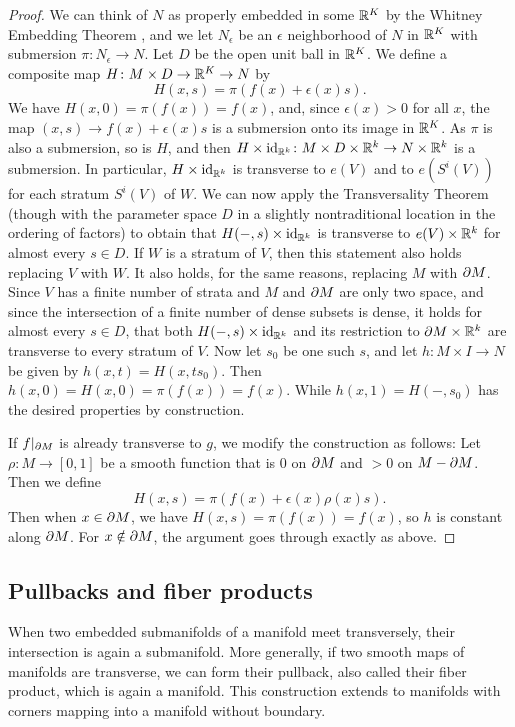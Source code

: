 \begin{proof}
	We can think of $N$ as properly embedded in some $\mathbb{R}^K$ by the Whitney Embedding Theorem \cite[Section 1.8]{GuPo74}, and we let $N_\epsilon$ be an $\epsilon$ neighborhood of $N$ in $\mathbb{R}^K$ with submersion $\pi \colon N_\epsilon \to N$.
	Let $D$ be the open unit ball in $\mathbb{R}^K$.
	We define a composite map $H \colon M \times D \to \mathbb{R}^K \to N$ by
	$$H(x,s) = \pi(f(x)+ \epsilon(x)s).$$
	We have $H(x,0) = \pi(f(x)) = f(x)$, and, since $\epsilon(x)>0$ for all $x$, the map $(x,s) \to f(x)+ \epsilon(x)s$ is a submersion onto its image in $\mathbb{R}^K$.
	As $\pi$ is also a submersion, so is $H$, and then $H \times \mathrm{id}_{\mathbb{R}^k} \colon M \times D \times \mathbb{R}^k \to N \times \mathbb{R}^k$ is a submersion.
	In particular, $H \times \mathrm{id}_{\mathbb{R}^k}$ is transverse to $e(V)$ and to $e(S^i(V))$ for each stratum $S^i(V)$ of $W$.
	We can now apply the Transversality Theorem (though with the parameter space $D$ in a slightly nontraditional location in the ordering of factors) to obtain that $H(-,s) \times \mathrm{id}_{\mathbb{R}^k}$ is transverse to $e(V) \times \mathbb{R}^k$ for almost every $s \in D$.
	If $W$ is a stratum of $V$, then this statement also holds replacing $V$ with $W$.
	It also holds, for the same reasons, replacing $M$ with $\partial M$.
	Since $V$ has a finite number of strata and $M$ and $\partial M$ are only two space, and since the intersection of a finite number of dense subsets is dense, it holds for almost every $s \in D$, that both $H(-,s) \times \mathrm{id}_{\mathbb{R}^k}$ and its restriction to $\partial M \times \mathbb{R}^k$ are transverse to every stratum of $V$.
	Now let $s_0$ be one such $s$, and let $h \colon M \times I \to N$ be given by $h(x,t) = H(x,ts_0)$.
	Then $h(x,0) = H(x,0) = \pi(f(x)) = f(x)$.
	While $h(x,1) = H(-,s_0)$ has the desired properties by construction.

	If $f|_{\partial M}$ is already transverse to $g$, we modify the construction as follows: Let $\rho \colon M \to [0,1]$ be a smooth function that is $0$ on $\partial M$ and $>0$ on $M-\partial M$.
	Then we define
	$$H(x,s) = \pi(f(x)+ \epsilon(x)\rho(x)s).$$
	Then when $x \in \partial M$, we have $H(x,s) = \pi(f(x)) = f(x)$, so $h$ is constant along $\partial M$.
	For $x \notin \partial M$, the argument goes through exactly as above.
\end{proof}

\subsection{Pullbacks and fiber products}

When two embedded submanifolds of a manifold meet transversely, their intersection is again a submanifold.
More generally, if two smooth maps of manifolds are transverse, we can form their pullback, also called their fiber product, which is again a manifold.
This construction extends to manifolds with corners mapping into a manifold without boundary.

